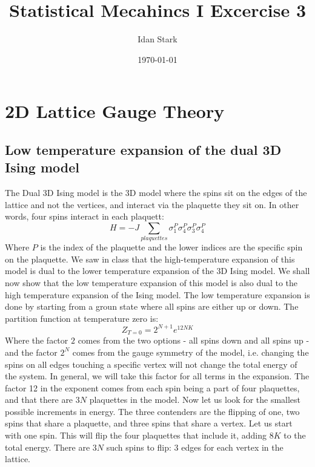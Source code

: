 \documentclass{article}
\title{Statistical Mecahincs I Excercise 3}
\author{Idan Stark}
\date{\today}
\begin{document}
\maketitle

\section{2D Lattice Gauge Theory}
\subsection{Low temperature expansion of the dual 3D Ising model}
The Dual 3D Ising model is the 3D model where the spins sit on the edges of the lattice and not the vertices, and interact via the plaquette they sit on. In other words, four spins interact in each plaquett:
\begin{equation}
    H = -J\sum_{plaquettes}\sigma^P_1\sigma^P_4\sigma^P_3\sigma^P_4
\end{equation}
Where $P$ is the index of the plaquette and the lower indices are the specific spin on the plaquette. We saw in class that the high-temperature expansion of this model is dual to the lower temperature expansion of the 3D Ising model. We shall now show that the low temperature expansion of this model is also dual to the high temperature expansion of the Ising model.
\newline
The low temperature expansion is done by starting from a groun state where all spins are either up or down. The partition function at temperature zero is:
\begin{equation}
    Z_{T=0} = 2^{N+1} e^{12NK}
\end{equation}
Where the factor $2$ comes from the two options - all spins down and all spins up - and the factor $2^N$ comes from the gauge symmetry of the model, i.e. changing the spins on all edges touching a specific vertex will not change the total energy of the system. In general, we will take this factor for all terms in the expansion. The factor 12 in the exponent comes from each spin being a part of four plaquettes, and that there are $3N$ plaquettes in the model.
\newline
Now let us look for the smallest possible increments in energy. The three contenders are the flipping of one, two spins that share a plaquette, and three spins that share a vertex.
\newline
Let us start with one spin. This will flip the four plaquettes that include it, adding $8K$ to the total energy. There are $3N$ such spins to flip: 3 edges for each vertex in the lattice.
\end{document}
